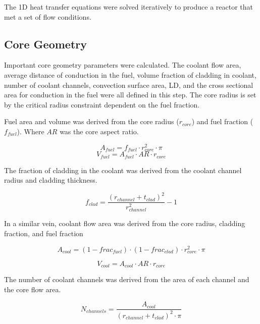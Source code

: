 The 1D heat transfer equations were solved iteratively to produce a reactor that
met a set of flow conditions.

\subsection{Core Geometry}
Important core geometry parameters were calculated. The coolant flow area,
average distance of conduction in the fuel, volume fraction of cladding in
coolant, number of coolant channels, convection surface area, LD, and the cross
sectional area for conduction in the fuel were all defined in this step. The
core radius is set by the critical
radius constraint dependent on the fuel fraction.

Fuel area and volume was derived from the core radius ($r_{core}$) and fuel
fraction ($f_{fuel}$). Where $AR$ was the core aspect ratio.

\begin{equation}
    A_{fuel} = f_{fuel}\cdot r_{core}^2 \cdot \pi
\end{equation}
\begin{equation}
    V_{fuel} = A_{fuel}\cdot AR\cdot r_{core}
\end{equation}

The fraction of cladding in the coolant was derived from the coolant channel
radius and cladding thickness.

\begin{equation}
    f_{clad} = \frac{(r_{channel} + t_{clad})^2}{r_{channel}^2} - 1 
\end{equation}

In a similar vein, coolant flow area was derived from the core radius, cladding
fraction, and fuel fraction

\begin{equation}
    A_{cool} = (1-frac_{fuel})\cdot (1-frac_{clad}) \cdot r_{core}^2 \cdot \pi
\end{equation}

\begin{equation}
    V_{cool} = A_{cool}\cdot AR\cdot r_{core}
\end{equation}

The number of coolant channels was derived from the area of each channel and the
core flow area.

\begin{equation}
    N_{channels} = \frac{A_{cool}}{(r_{channel} + t_{clad})^2 \cdot \pi}
\end{equation}

